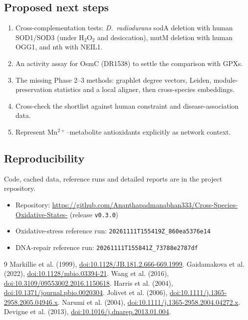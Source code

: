 \subsection{Proposed next steps}

\begin{enumerate}
  \item Cross-complementation tests: \emph{D.~radiodurans} sodA deletion with human SOD1/SOD3
    (under H$_2$O$_2$ and desiccation), mutM deletion with human OGG1, and nth with NEIL1.
  \item An activity assay for OsmC (DR1538) to settle the comparison with GPXs.
  \item The missing Phase 2--3 methods: graphlet degree vectors, Leiden, module-preservation
    statistics and a local aligner, then cross-species embeddings.
  \item Cross-check the shortlist against human constraint and disease-association data.
  \item Represent Mn$^{2+}$--metabolite antioxidants explicitly as network context.
\end{enumerate}

\subsection{Reproducibility}

Code, cached data, reference runs and detailed reports are in the project repository.

\begin{itemize}
  \item Repository: \url{https://github.com/Ananthapadmanabhan333/Cross-Species-Oxidative-States-}
    (release \texttt{v0.3.0})
  \item Oxidative-stress reference run: \texttt{20261111T155419Z\_860ea5376e14}
  \item DNA-repair reference run: \texttt{20261111T155841Z\_73788e2787df}
\end{itemize}

\begin{thebibliography}{9}
 Markillie et al. (1999), \href{https://doi.org/10.1128/JB.181.2.666-669.1999}{doi:10.1128/JB.181.2.666-669.1999}.
 Gaidamakova et al. (2022), \href{https://doi.org/10.1128/mbio.03394-21}{doi:10.1128/mbio.03394-21}.
 Wang et al. (2016), \href{https://doi.org/10.3109/09553002.2016.1150618}{doi:10.3109/09553002.2016.1150618}.
 Harris et al. (2004), \href{https://doi.org/10.1371/journal.pbio.0020304}{doi:10.1371/journal.pbio.0020304}.
 Jolivet et al. (2006), \href{https://doi.org/10.1111/j.1365-2958.2005.04946.x}{doi:10.1111/j.1365-2958.2005.04946.x}.
 Narumi et al. (2004), \href{https://doi.org/10.1111/j.1365-2958.2004.04272.x}{doi:10.1111/j.1365-2958.2004.04272.x}.
 Devigne et al. (2013), \href{https://doi.org/10.1016/j.dnarep.2013.01.004}{doi:10.1016/j.dnarep.2013.01.004}.
\end{thebibliography}
